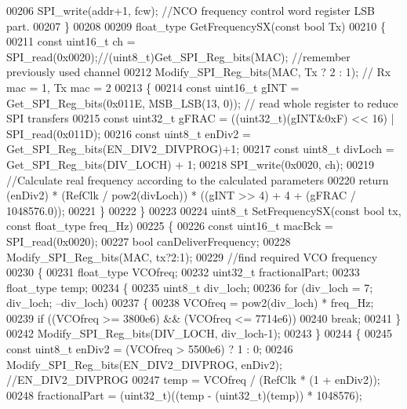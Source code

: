 \begin{DoxyCode}
00206     SPI_write(addr+1, fcw); \textcolor{comment}{//NCO frequency control word register LSB part.}
00207 \}
00208 
00209 float_type GetFrequencySX(\textcolor{keyword}{const} \textcolor{keywordtype}{bool} Tx)
00210 \{
00211     \textcolor{keyword}{const} uint16\_t ch = SPI_read(0x0020);\textcolor{comment}{//(uint8\_t)Get\_SPI\_Reg\_bits(MAC); //remember previously used
       channel}
00212     Modify_SPI_Reg_bits(MAC, Tx ? 2 : 1); \textcolor{comment}{// Rx mac = 1, Tx mac = 2}
00213     \{
00214         \textcolor{keyword}{const} uint16\_t gINT = Get_SPI_Reg_bits(0x011E, MSB_LSB(13, 0));    \textcolor{comment}{// read whole register to reduce
       SPI transfers}
00215         \textcolor{keyword}{const} uint32\_t gFRAC = ((uint32\_t)(gINT&0xF) << 16) | SPI_read(0x011D);
00216         \textcolor{keyword}{const} uint8\_t enDiv2 = Get_SPI_Reg_bits(EN_DIV2_DIVPROG)+1;
00217         \textcolor{keyword}{const} uint8\_t divLoch = Get_SPI_Reg_bits(DIV_LOCH) + 1;
00218         SPI_write(0x0020, ch);
00219         \textcolor{comment}{//Calculate real frequency according to the calculated parameters}
00220         \textcolor{keywordflow}{return} (enDiv2) * (RefClk / pow2(divLoch)) * ((gINT >> 4) + 4 + (gFRAC / 1048576.0));
00221     \}
00222 \}
00223 
00224 uint8\_t SetFrequencySX(\textcolor{keyword}{const} \textcolor{keywordtype}{bool} tx, \textcolor{keyword}{const} float_type freq\_Hz)
00225 \{
00226     \textcolor{keyword}{const} uint16\_t macBck = SPI_read(0x0020);
00227     \textcolor{keywordtype}{bool} canDeliverFrequency;
00228     Modify_SPI_Reg_bits(MAC, tx?2:1);
00229     \textcolor{comment}{//find required VCO frequency}
00230     \{
00231         float_type VCOfreq;
00232         uint32\_t fractionalPart;
00233         float_type temp;
00234         \{
00235             uint8\_t div\_loch;
00236             \textcolor{keywordflow}{for} (div\_loch = 7; div\_loch; --div\_loch)
00237             \{
00238                 VCOfreq = pow2(div\_loch) * freq\_Hz;
00239                 \textcolor{keywordflow}{if} ((VCOfreq >= 3800e6) && (VCOfreq <= 7714e6))
00240                     \textcolor{keywordflow}{break};
00241             \}
00242             Modify_SPI_Reg_bits(DIV_LOCH, div\_loch-1);
00243         \}
00244         \{
00245             \textcolor{keyword}{const} uint8\_t enDiv2 = (VCOfreq > 5500e6) ? 1 : 0;
00246             Modify_SPI_Reg_bits(EN_DIV2_DIVPROG, enDiv2); \textcolor{comment}{//EN\_DIV2\_DIVPROG}
00247             temp = VCOfreq / (RefClk * (1 + enDiv2));
00248             fractionalPart = (uint32\_t)((temp - (uint32\_t)(temp)) * 1048576);

\end{DoxyCode}
